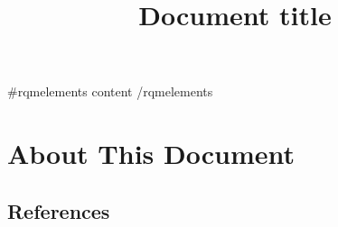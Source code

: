 \documentclass[a4paper,11pt]{article}
\title{Document title}
\begin{document}
	\setcounter{tocdepth}{3}
	\renewcommand\contentsname{Contents}
	\tableofcontents
	
	\bigskip
	
	\setcounter{tocdepth}{1}
	\renewcommand\contentsname{List of Figures}
	\begingroup
	\let\clearpage\relax
	\listoffigures
	\endgroup
	
	\bigskip

	\setcounter{tocdepth}{1}
	\renewcommand\contentsname{List of Tables}
	\begingroup
	\let\clearpage\relax
	\listoftables
	\endgroup

    \newpage
    
    \let\stdsection\section
    \renewcommand\section{\newpage\stdsection}

{{#rqmelements}}
{{{content}}}
{{/rqmelements}}
	
	\section{About This Document}
	
	\subsection{References}
	
\end{document}
